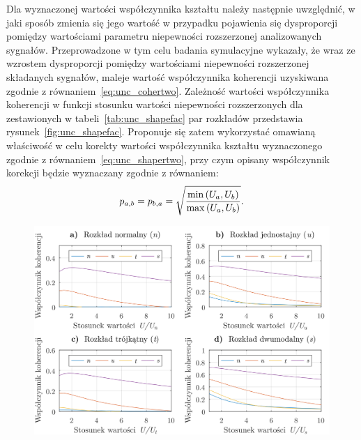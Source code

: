 Dla wyznaczonej wartości współczynnika kształtu należy następnie uwzględnić, w jaki sposób zmienia się jego wartość w przypadku pojawienia się dysproporcji pomiędzy wartościami parametru niepewności rozszerzonej analizowanych sygnałów. Przeprowadzone w tym celu badania symulacyjne wykazały, że wraz ze wzrostem dysproporcji pomiędzy wartościami niepewności rozszerzonej składanych sygnałów, maleje wartość współczynnika koherencji uzyskiwana zgodnie z równaniem~\eqref{eq:unc_cohertwo}. Zależność wartości współczynnika koherencji w funkcji stosunku wartości niepewności rozszerzonych dla zestawionych w tabeli~\ref{tab:unc_shapefac} par rozkładów przedstawia rysunek~\ref{fig:unc_shapefac}. Proponuje się zatem wykorzystać omawianą właściwość w celu korekty wartości współczynnika kształtu wyznaczonego zgodnie z równaniem~\eqref{eq:unc_shapertwo}, przy czym opisany współczynnik korekcji będzie wyznaczany zgodnie z równaniem:
\begin{equation}
p_{a,b} = p_{b,a} = \sqrt{\frac{\min \left(U_{a}, U_{b}\right)}{\max \left(U_{a}, U_{b}\right)}} \label{eq:unc_cohercorra}.
\end{equation}

\begin{figure}[htb!]
\begin{center}
\includegraphics{obrazki/shapes}
\end{center}
\end{figure}

